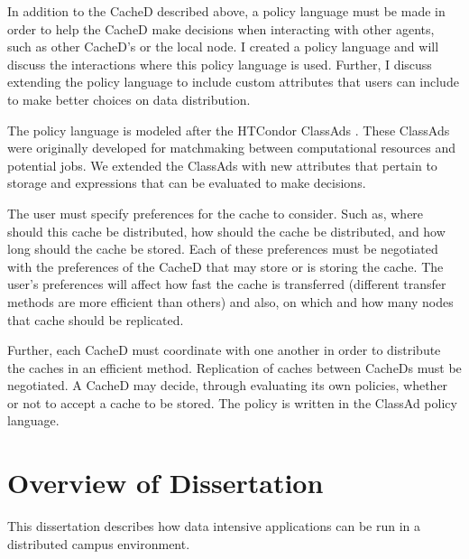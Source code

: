 In addition to the CacheD described above, a policy language must be made in order to help the CacheD make decisions when interacting with other agents, such as other CacheD's or the local node.  I created a policy language and will discuss the  interactions where this policy language is used.  Further, I discuss extending the policy language to include custom attributes that users can include to make better choices on data distribution.

The policy language is modeled after the HTCondor \mbox{ClassAds} \cite{raman1998matchmaking}.  These \mbox{ClassAds} were originally developed for matchmaking between computational resources and potential jobs.  We extended the ClassAds with new attributes that pertain to storage and expressions that can be evaluated to make decisions.

The user must specify preferences for the cache to consider.  Such as, where should this cache be distributed, how should the cache be distributed, and how long should the cache be stored.  Each of these preferences must be negotiated with the preferences of the CacheD that may store or is storing the cache.  The user's preferences will affect how fast the cache is transferred (different transfer methods are more efficient than others) and also, on which and how many nodes that cache should be replicated.

Further, each CacheD must coordinate with one another in order to distribute the caches in an efficient method.  Replication of caches between CacheDs must be negotiated.  A CacheD may decide, through evaluating its own policies, whether or not to accept a cache to be stored.  The policy is written in the ClassAd policy language.



\section{Overview of Dissertation}

This dissertation describes how data intensive applications can be run in a distributed campus environment.

